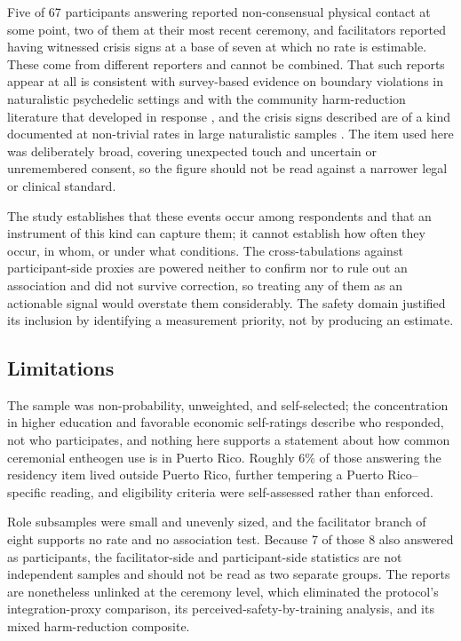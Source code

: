 \documentclass[12pt]{article}
\begin{document}
Five of 67 participants answering reported non-consensual physical contact at some point, two of them at
their most recent ceremony, and facilitators reported having witnessed crisis signs at a base of seven at
which no rate is estimable. These come from different reporters and cannot be combined. That such reports
appear at all is consistent with survey-based evidence on boundary violations in naturalistic psychedelic
settings \citep{kruger2025psychedelic,mcnamee2023studying} and with the community harm-reduction literature
that developed in response \citep{peluso2020reflections}, and the crisis signs described are of a kind
documented at non-trivial rates in large naturalistic samples
\citep{carbonaro2016survey,bouso2022adverse}. The item used here was deliberately broad, covering
unexpected touch and uncertain or unremembered consent, so the figure should not be read against a narrower
legal or clinical standard.

The study establishes that these events occur among respondents and that an instrument of this kind can
capture them; it cannot establish how often they occur, in whom, or under what conditions. The
cross-tabulations against participant-side proxies are powered neither to confirm nor to rule out an
association and did not survive correction, so treating any of them as an actionable signal would overstate
them considerably. The safety domain justified its inclusion by identifying a measurement priority, not by
producing an estimate.

\subsection{Limitations}

The sample was non-probability, unweighted, and self-selected; the concentration in higher education and
favorable economic self-ratings describe who responded, not who participates, and nothing here supports a
statement about how common ceremonial entheogen use is in Puerto Rico. Roughly 6\% of those answering the
residency item lived outside Puerto Rico, further tempering a Puerto Rico--specific reading, and eligibility
criteria were self-assessed rather than enforced.

Role subsamples were small and unevenly sized, and the facilitator branch of eight supports no rate and no
association test. Because 7 of those 8 also answered as participants, the facilitator-side and
participant-side statistics are not independent samples and should not be read as two separate groups. The
reports are nonetheless unlinked at the ceremony level, which eliminated the protocol's integration-proxy
comparison, its perceived-safety-by-training analysis, and its mixed harm-reduction composite.
\end{document}
